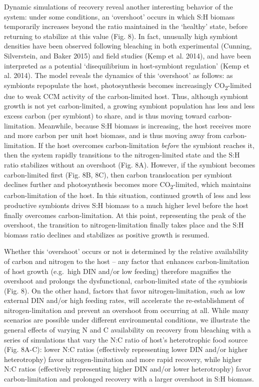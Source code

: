 \documentclass[]{elsarticle} %
\begin{document}
Dynamic simulations of recovery reveal another interesting behavior of
the system: under some conditions, an `overshoot' occurs in which S:H
biomass temporarily increases beyond the ratio maintained in the
`healthy' state, before returning to stabilize at this value (Fig. 8).
In fact, unusually high symbiont densities have been observed following
bleaching in both experimental (Cunning, Silverstein, and Baker 2015)
and field studies (Kemp et al. 2014), and have been interpreted as a
potential `disequilibrium in host-symbiont regulation' (Kemp et al.
2014). The model reveals the dynamics of this `overshoot' as follows: as
symbionts repopulate the host, photosynthesis becomes increasingly
CO\textsubscript{2}-limited due to weak CCM activity of the
carbon-limited host. Thus, although symbiont growth is not yet
carbon-limited, a growing symbiont population has less and less excess
carbon (per symbiont) to share, and is thus moving toward
carbon-limitation. Meanwhile, because S:H biomass is increasing, the
host receives more and more carbon per unit host biomass, and is thus
moving away from carbon-limitation. If the host overcomes
carbon-limitation \emph{before} the symbiont reaches it, then the system
rapidly transitions to the nitrogen-limited state and the S:H ratio
stabilizes without an overshoot (Fig. 8A). However, if the symbiont
becomes carbon-limited first (Fig. 8B, 8C), then carbon translocation
per symbiont declines further and photosynthesis becomes more
CO\textsubscript{2}-limited, which maintains carbon-limitation of the
host. In this situation, continued growth of less and less productive
symbionts drives S:H biomass to a much higher level before the host
finally overcomes carbon-limitation. At this point, representing the
peak of the overshoot, the transition to nitrogen-limitation finally
takes place and the S:H biomass ratio declines and stabilizes as
positive growth is resumed.

Whether this `overshoot' occurs or not is determined by the relative
availability of carbon and nitrogen to the host -- any factor that
enhances carbon-limitation of host growth (e.g.~high DIN and/or low
feeding) therefore magnifies the overshoot and prolongs the
dysfunctional, carbon-limited state of the symbiosis (Fig. 8). On the
other hand, factors that favor nitrogen-limitation, such as low external
DIN and/or high feeding rates, will accelerate the re-establishment of
nitrogen-limitation and prevent an overshoot from occurring at all.
While many scenarios are possible under different environmental
conditions, we illustrate the general effects of varying N and C
availability on recovery from bleaching with a series of simulations
that vary the N:C ratio of host's heterotrophic food source (Fig. 8A-C):
lower N:C ratios (effectively representing lower DIN and/or higher
heterotrophy) favor nitrogen-limitation and more rapid recovery, while
higher N:C ratios (effectively representing higher DIN and/or lower
heterotrophy) favor carbon-limitation and prolonged recovery with a
larger overshoot in S:H biomass.
\end{document}

